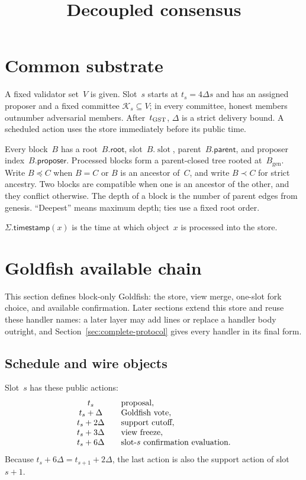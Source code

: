 \documentclass{article}
\title{Decoupled consensus}
\author{}
\date{}
\theoremstyle{plain}
\theoremstyle{definition}
\theoremstyle{remark}
\newcommand{\genesis}{B_{\mathrm{gen}}}
\newcommand{\slot}{\operatorname{slot}}
\newcommand{\parent}{\mathsf{parent}}
\newcommand{\proposer}{\mathsf{proposer}}
\newcommand{\rootf}{\mathsf{root}}
\newcommand{\committee}{\mathcal K}
\newcommand{\timestamp}{\mathsf{timestamp}}
\begin{document}
\maketitle

\section{Common substrate}\label{sec:substrate}

A fixed validator set~$V$ is given.  Slot~$s$ starts at $t_s=4\Delta s$ and
has an assigned proposer and a fixed committee $\committee_s\subseteq V$; in
every committee, honest members outnumber adversarial members.
After~$t_{\rm GST}$, $\Delta$ is a strict delivery bound.  A scheduled action
uses the store immediately before its public time.

Every block~$B$ has a root~$B.\rootf$, slot~$B.\slot$, parent~$B.\parent$,
and proposer index~$B.\proposer$.
Processed blocks form a parent-closed tree rooted at~$\genesis$.  Write
$B\preceq C$ when $B=C$ or $B$ is an ancestor of~$C$, and write $B\prec C$
for strict ancestry.  Two blocks are compatible when one is an ancestor of
the other, and they conflict otherwise.
The depth of a block is the number of parent edges from genesis.  ``Deepest''
means maximum depth; ties use a fixed root order.

$\Sigma.\timestamp(x)$ is the time at which object~$x$ is processed into the
store.

\section{Goldfish available chain}\label{sec:goldfish}

This section defines block-only Goldfish: the store, view merge, one-slot fork
choice, and available confirmation.  Later sections extend this store
and reuse these handler names: a later layer may add lines or replace a
handler body outright, and
Section~\ref{sec:complete-protocol} gives every handler in its final
form.

\subsection{Schedule and wire objects}\label{sec:goldfish-schedule}

Slot~$s$ has these public actions:
\[
\begin{array}{c@{\qquad}l}
 t_s             & \text{proposal},\\
 t_s+\Delta      & \text{Goldfish vote},\\
 t_s+2\Delta     & \text{support cutoff},\\
 t_s+3\Delta     & \text{view freeze},\\
 t_s+6\Delta     & \text{slot-$s$ confirmation evaluation}.
\end{array}
\]
Because $t_s+6\Delta=t_{s+1}+2\Delta$, the last action is also the support
action of slot~$s+1$.
\end{document}
